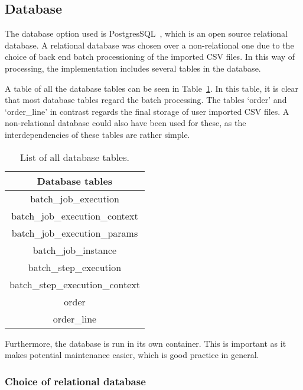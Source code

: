 \subsection{Database}\label{subsec:database}

The database option used is PostgresSQL~\cite{postgresql2024}, which is an open source relational database.
A relational database was chosen over a non-relational one due to the choice of back end batch processioning of the
imported CSV files.
In this way of processing, the implementation includes several tables in the database.

A table of all the database tables can be seen in Table~\ref{tab:database-tables}.
In this table, it is clear that most database tables regard the batch processing.
The tables `order' and `order\_line' in contrast regards the final storage of user imported CSV files.
A non-relational database could also have been used for these, as the interdependencies of these tables are rather
simple.

\begin{table}[H]
    \centering
    \begin{tabular}{c}
        \toprule
        \textbf{Database tables}
        \\ \midrule
        batch\_job\_execution
        \\ \midrule
        batch\_job\_execution\_context
        \\ \midrule
        batch\_job\_execution\_params
        \\ \midrule
        batch\_job\_instance
        \\ \midrule
        batch\_step\_execution
        \\ \midrule
        batch\_step\_execution\_context
        \\ \midrule
        order
        \\ \midrule
        order\_line
        \\ \bottomrule
    \end{tabular}%
    \caption{List of all database tables.
    }\label{tab:database-tables}
\end{table}

Furthermore, the database is run in its own container.
This is important as it makes potential maintenance easier, which is good practice in general.

\subsubsection{Choice of relational database}\label{subsubsec:choice-of-relational-database}

